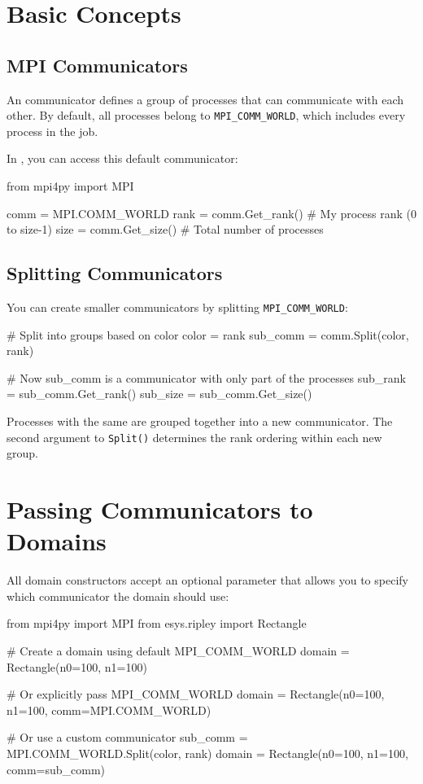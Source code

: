 \section{Basic Concepts}

\subsection{MPI Communicators}

An \MPI communicator defines a group of processes that can communicate with each other.
By default, all processes belong to \texttt{MPI\_COMM\_WORLD}, which includes every process in the job.

In \mpifo, you can access this default communicator:
\begin{python}
from mpi4py import MPI

comm = MPI.COMM_WORLD
rank = comm.Get_rank()  # My process rank (0 to size-1)
size = comm.Get_size()  # Total number of processes
\end{python}

\subsection{Splitting Communicators}

You can create smaller communicators by splitting \texttt{MPI\_COMM\_WORLD}:
\begin{python}
# Split into groups based on color
color = rank %
sub_comm = comm.Split(color, rank)

# Now sub_comm is a communicator with only part of the processes
sub_rank = sub_comm.Get_rank()
sub_size = sub_comm.Get_size()
\end{python}

Processes with the same  are grouped together into a new communicator.
The second argument to \texttt{Split()} determines the rank ordering within each new group.

\section{Passing Communicators to \escript Domains}

All \escript domain constructors accept an optional  parameter that allows you to specify which \MPI communicator the domain should use:

\begin{python}
from mpi4py import MPI
from esys.ripley import Rectangle

# Create a domain using default MPI_COMM_WORLD
domain = Rectangle(n0=100, n1=100)

# Or explicitly pass MPI_COMM_WORLD
domain = Rectangle(n0=100, n1=100, comm=MPI.COMM_WORLD)

# Or use a custom communicator
sub_comm = MPI.COMM_WORLD.Split(color, rank)
domain = Rectangle(n0=100, n1=100, comm=sub_comm)
\end{python}

